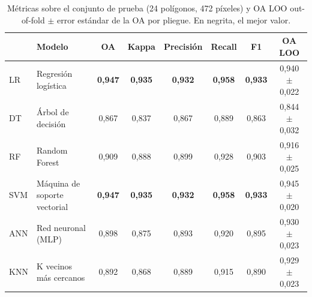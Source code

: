 \begin{table}[htbp]
 \centering
 \small
\setlength{\tabcolsep}{4pt}
 \caption{Métricas sobre el conjunto de prueba (24 polígonos, 472 píxeles) y OA LOO out-of-fold $\pm$ error estándar de la OA por pliegue. En negrita, el mejor valor.}
 \label{tab:metricas}
 \begin{tabular}{llcccccc}
  \toprule
   & Modelo & OA & Kappa & Precisión & Recall & F1 & OA LOO \\
  \midrule
  LR & Regresión logística & \textbf{0{,}947} & \textbf{0{,}935} & \textbf{0{,}932} & \textbf{0{,}958} & \textbf{0{,}933} & 0{,}940 $\pm$ 0{,}022 \\
  DT & Árbol de decisión & 0{,}867 & 0{,}837 & 0{,}867 & 0{,}889 & 0{,}863 & 0{,}844 $\pm$ 0{,}032 \\
  RF & Random Forest & 0{,}909 & 0{,}888 & 0{,}899 & 0{,}928 & 0{,}903 & 0{,}916 $\pm$ 0{,}025 \\
  SVM & Máquina de soporte vectorial & \textbf{0{,}947} & \textbf{0{,}935} & \textbf{0{,}932} & \textbf{0{,}958} & \textbf{0{,}933} & 0{,}945 $\pm$ 0{,}020 \\
  ANN & Red neuronal (MLP) & 0{,}898 & 0{,}875 & 0{,}893 & 0{,}920 & 0{,}895 & 0{,}930 $\pm$ 0{,}023 \\
  KNN & K vecinos más cercanos & 0{,}892 & 0{,}868 & 0{,}889 & 0{,}915 & 0{,}890 & 0{,}929 $\pm$ 0{,}023 \\
  \bottomrule
 \end{tabular}
\end{table}
